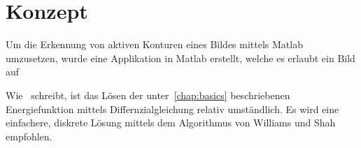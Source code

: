 \chapter{Konzept}
\label{chap:concept}


Um die Erkennung von aktiven Konturen eines Bildes mittels Matlab umzusetzen, wurde eine Applikation in Matlab erstellt, welche es erlaubt ein Bild auf 

Wie~\citet[S. 147]{hudritsch:script:cp} schreibt, ist das Lösen der unter~\ref{chap:basics} beschriebenen Energiefunktion mittels Differnzialgleichung relativ umständlich. Es wird eine einfachere, diskrete Lösung mittels dem Algorithmus von Williams und Shah empfohlen.
